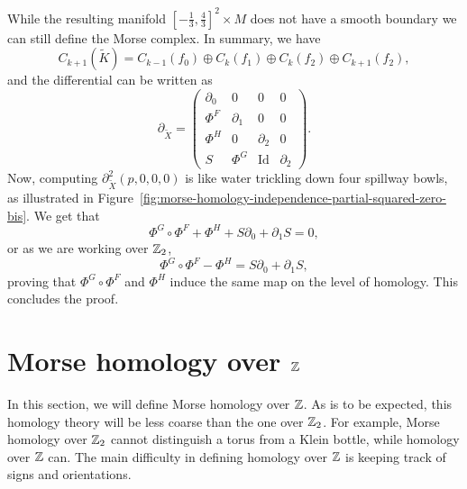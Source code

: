 \begin{myproof}
While the resulting manifold $[-\frac{1}{3}, \frac{4}{3}]^2 \times M$ does not have a smooth boundary we can still define the Morse complex.
In summary, we have
\[
    C_{k+1}(\tilde{K}) = C_{k-1}(f_0) \oplus C_k(f_1) \oplus C_k(f_2) \oplus C_{k+1}(f_2)
,\] 
and the differential can be written as
\[
\partial_{\tilde{X}} = \begin{pmatrix}
    \partial_0 & 0 & 0 & 0\\
    \Phi^{F} &\partial_1 & 0 & 0 \\
    \Phi^{H} & 0 & \partial_2 & 0 \\
    S & \Phi^{G} & \operatorname{Id} & \partial_2
\end{pmatrix}
.\] 
Now, computing $\partial_{\tilde{X}}^2(p, 0, 0, 0)$ is like water trickling down four spillway bowls, as illustrated in Figure~\ref{fig:morse-homology-independence-partial-squared-zero-bis}. We get that
\[
\Phi^{G}  \circ  \Phi^{F} + \Phi^{H} + S \partial_0 + \partial_1 S = 0
,\] 
or as we are working over $\mathbb{Z}_2$,
\[
    \Phi^{G}  \circ \Phi^{F} - \Phi^{H} = S \partial_0 + \partial_1 S
,\] 
proving that $\Phi^{G}  \circ \Phi^{F}$ and $\Phi^{H}$ induce the same map on the level of homology.
This concludes the proof.
\end{myproof}

\begin{figure*}
    \centering
    \vspace*{2cm}
\end{figure*}


\filbreak
\section{Morse homology over $\mathbb{Z}$}
In this section, we will define Morse homology over $\mathbb{Z}$.
As is to be expected, this homology theory will be less coarse than the one over $\mathbb{Z}_2$. For example, Morse homology over $\mathbb{Z}_2$ cannot distinguish a torus from a Klein bottle, while homology over $\mathbb{Z}$ can.
The main difficulty in defining homology over $\mathbb{Z}$ is keeping track of signs and orientations.

